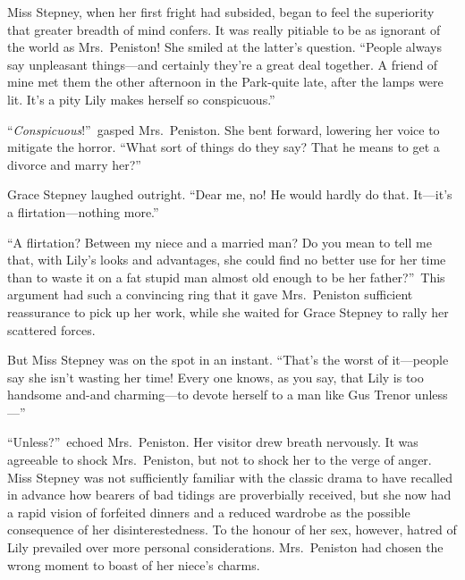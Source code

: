 \documentclass[12pt,a4paper]{book}
\begin{document}
Miss Stepney, when her first fright had subsided, began to feel
the superiority that greater breadth of mind confers. It was
really pitiable to be as ignorant of the world as Mrs.\ Peniston! 
She smiled at the latter's question. ``People always say
unpleasant things---and certainly they're a great deal together. A
friend of mine met them the other afternoon in the Park-quite
late, after the lamps were lit. It's a pity Lily makes herself so
conspicuous.''





``\textit{Conspicuous}!''\ gasped Mrs.\ Peniston. She bent forward, lowering
her voice to mitigate the horror. ``What sort of things do they
say? That he means to get a divorce and marry her?''





Grace Stepney laughed outright. ``Dear me, no! He would hardly do
that. It---it's a flirtation---nothing more.''





``A flirtation? Between my niece and a married man? Do you mean to
tell me that, with Lily's looks and advantages, she could find no
better use for her time than to waste it on a fat stupid man
almost old enough to be her father?''\ This argument had such a
convincing ring that it gave Mrs.\ Peniston sufficient reassurance
to pick up her work, while she waited for Grace Stepney to rally
her scattered forces.





But Miss Stepney was on the spot in an instant. ``That's the worst
of it---people say she isn't wasting her time! Every one knows, as
you say, that Lily is too handsome and-and charming---to devote
herself to a man like Gus Trenor unless---''





``Unless?''\ echoed Mrs.\ Peniston. Her visitor drew breath
nervously. It was agreeable to shock Mrs.\ Peniston, but not to
shock her to the verge of anger. Miss Stepney was not
sufficiently familiar with the classic drama to have recalled in
advance how bearers of bad tidings are proverbially received, but
she now had a rapid vision of forfeited dinners and a reduced
wardrobe as the possible consequence of her disinterestedness. To
the honour of her sex, however, hatred of Lily prevailed over
more personal considerations. Mrs.\ Peniston had chosen the wrong
moment to boast of her niece's charms.
\end{document}
